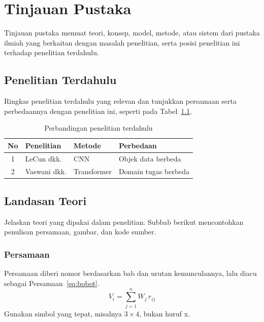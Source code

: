 \chapter{Tinjauan Pustaka}
Tinjauan pustaka memuat teori, konsep, model, metode, atau sistem dari pustaka
ilmiah yang berkaitan dengan masalah penelitian, serta posisi penelitian ini
terhadap penelitian terdahulu.

\section{Penelitian Terdahulu}
Ringkas penelitian terdahulu yang relevan dan tunjukkan persamaan serta
perbedaannya dengan penelitian ini, seperti pada Tabel~\ref{tab:terdahulu}.

\begin{table}[htbp]
  \caption{Perbandingan penelitian terdahulu}
  \label{tab:terdahulu}
  \centering
  \begin{tabular}{|c|p{}|p{}|p{}|}
    \hline
    \textbf{No} & \textbf{Penelitian} & \textbf{Metode} & \textbf{Perbedaan} \\
    \hline
    1 & LeCun dkk. \cite{lecun1998gradient} & CNN & Objek data berbeda \\
    \hline
    2 & Vaswani dkk. \cite{vaswani2017attention} & Transformer & Domain tugas berbeda \\
    \hline
  \end{tabular}
\end{table}

\section{Landasan Teori}
Jelaskan teori yang dipakai dalam penelitian. Subbab berikut mencontohkan
penulisan persamaan, gambar, dan kode sumber.

\subsection{Persamaan}
Persamaan diberi nomor berdasarkan bab dan urutan kemunculannya, lalu diacu
sebagai Persamaan~\ref{eq:bobot}.
\begin{equation}
  V_i = \sum_{j=1}^{n} W_j \, r_{ij}
  \label{eq:bobot}
\end{equation}
Gunakan simbol yang tepat, misalnya $3 \times 4$, bukan huruf x.

